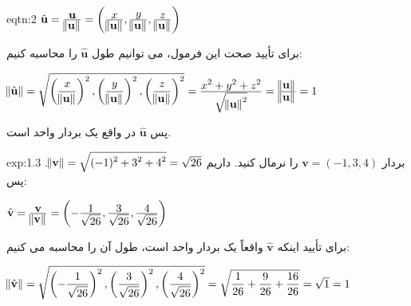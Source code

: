 {\begin{spacing}{1.5}
        \begin{eqtn}{eqtn:2}
            \centering
            $\hat{\textbf{u}}=\frac{\displaystyle\textbf{u}}{\displaystyle\norm{\textbf{u}}}=\left(\frac{\displaystyle x}{\displaystyle\norm{\textbf{u}}},
            \frac{\displaystyle y}{\displaystyle\norm{\textbf{u}}}, \frac{\displaystyle z}{\displaystyle\norm{\textbf{u}}}\right)$
        \end{eqtn}

        برای تأیید صحت این فرمول، می توانیم طول $\hat{\textbf{u}}$ را محاسبه کنیم:

        \begin{center}
            $\norm{\hat{\textbf{u}}}=\sqrt{\displaystyle \left(\frac{\displaystyle x}{\displaystyle\norm{\textbf{u}}}\right)^2,
                \left(\frac{\displaystyle y}{\displaystyle\norm{\textbf{u}}}\right)^2,
                \left(\frac{\displaystyle z}{\displaystyle\norm{\textbf{u}}}\right)^2}=\frac{\displaystyle x^2+y^2+z^2}{\displaystyle\sqrt{\displaystyle \norm{\textbf{u}}^2}}
            =\frac{\displaystyle\norm{\textbf{u}}}{\displaystyle\norm{\textbf{u}}}=1$
        \end{center}

        پس $\hat{\textbf{u}}$ در واقع یک بردار واحد است.

        \begin{example}{exp:1.3}
            بردار $\textbf{v}=(-1,3,4)$ را نرمال کنید. داریم $\norm{\textbf{v}}=\sqrt{\displaystyle (-1)^2+3^2+4^2}=\sqrt{\displaystyle 26}$. پس:

            \begin{center}
                $\hat{\textbf{v}}=\frac{\displaystyle\textbf{v}}{\displaystyle\norm{\textbf{v}}}=\left(-\frac{\displaystyle 1}{\displaystyle\sqrt{\displaystyle 26}},
                \frac{\displaystyle 3}{\displaystyle\sqrt{\displaystyle 26}}, \frac{\displaystyle 4}{\displaystyle\sqrt{\displaystyle 26}}\right)$
            \end{center}

            برای تأیید اینکه $\hat{\textbf{v}}$ واقعاً یک بردار واحد است، طول آن را محاسبه می کنیم:

            \begin{center}
                $\norm{\hat{\textbf{v}}}=\sqrt{\displaystyle \left(-\frac{\displaystyle 1}{\displaystyle\sqrt{\displaystyle 26}}\right)^2,
                    \left(\frac{\displaystyle 3}{\displaystyle\sqrt{\displaystyle 26}}\right)^2, \left(\frac{\displaystyle 4}{\displaystyle\sqrt{\displaystyle 26}}\right)^2}=
                \sqrt{\displaystyle\frac{\displaystyle 1}{\displaystyle 26}+\frac{\displaystyle 9}{\displaystyle 26}+\frac{\displaystyle 16}{\displaystyle 26}}=\sqrt{\displaystyle 1}=1$
            \end{center}
        \end{example}
    \end{spacing}
}

